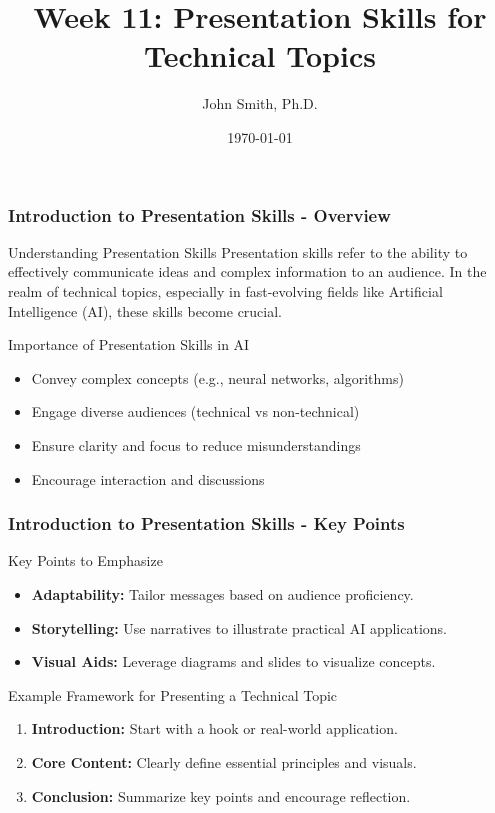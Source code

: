 \documentclass[aspectratio=169]{beamer}
\title[Presentation Skills for Technical Topics]{Week 11: Presentation Skills for Technical Topics}
\author[J. Smith]{John Smith, Ph.D.}
\institute[University Name]{
  Department of Computer Science\\
  University Name\\
  \vspace{0.3cm}
  Email: email@university.edu\\
  Website: www.university.edu
}
\date{\today}
\begin{document}
\frame{\titlepage}

\begin{frame}[fragile]
    \frametitle{Introduction to Presentation Skills - Overview}
    \begin{block}{Understanding Presentation Skills}
        Presentation skills refer to the ability to effectively communicate ideas and complex information to an audience. In the realm of technical topics, especially in fast-evolving fields like Artificial Intelligence (AI), these skills become crucial.
    \end{block}

    \begin{block}{Importance of Presentation Skills in AI}
        \begin{itemize}
            \item Convey complex concepts (e.g., neural networks, algorithms)
            \item Engage diverse audiences (technical vs non-technical)
            \item Ensure clarity and focus to reduce misunderstandings
            \item Encourage interaction and discussions 
        \end{itemize}
    \end{block}
\end{frame}

\begin{frame}[fragile]
    \frametitle{Introduction to Presentation Skills - Key Points}
    \begin{block}{Key Points to Emphasize}
        \begin{itemize}
            \item \textbf{Adaptability:} Tailor messages based on audience proficiency.
            \item \textbf{Storytelling:} Use narratives to illustrate practical AI applications.
            \item \textbf{Visual Aids:} Leverage diagrams and slides to visualize concepts.
        \end{itemize}
    \end{block}

    \begin{block}{Example Framework for Presenting a Technical Topic}
        \begin{enumerate}
            \item \textbf{Introduction:} Start with a hook or real-world application.
            \item \textbf{Core Content:} Clearly define essential principles and visuals.
            \item \textbf{Conclusion:} Summarize key points and encourage reflection.
        \end{enumerate}
    \end{block}
\end{frame}
\end{document}

